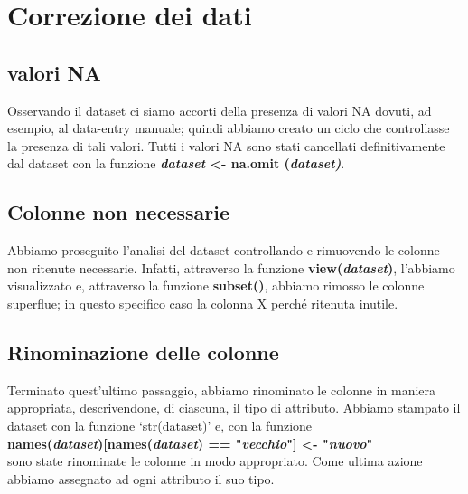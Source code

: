 \documentclass{article}
\begin{document}
\section{ Correzione dei dati }
\subsection{ valori NA }
Osservando il dataset ci siamo accorti della presenza di valori NA dovuti, ad esempio, al data-entry manuale; quindi abbiamo creato un ciclo che controllasse la presenza di tali valori. Tutti i valori NA sono stati cancellati definitivamente dal dataset con la funzione \textbf{\textit{dataset }\textless- na.omit (\textit{dataset)}}.


\subsection{ Colonne non necessarie }
Abbiamo proseguito l’analisi del dataset controllando e rimuovendo le colonne non ritenute necessarie. Infatti, attraverso la funzione \textbf{view(\textit{dataset})}, l’abbiamo visualizzato e, attraverso la funzione \textbf{subset()}, abbiamo rimosso le colonne superflue; in questo specifico caso la colonna X perché ritenuta inutile.

\subsection { Rinominazione delle colonne }
Terminato quest’ultimo passaggio, abbiamo rinominato le colonne in maniera appropriata, descrivendone, di ciascuna, il tipo di attributo. 
Abbiamo stampato il dataset con la funzione ‘str(dataset)’ e, con la funzione \\\textbf{names(\textit{dataset})[names(\textit{dataset}) == "\textit{vecchio}"] \textless- "\textit{nuovo}"}\\  sono state rinominate le colonne in modo appropriato. Come ultima azione abbiamo assegnato ad ogni attributo il suo tipo.
\end{document}
